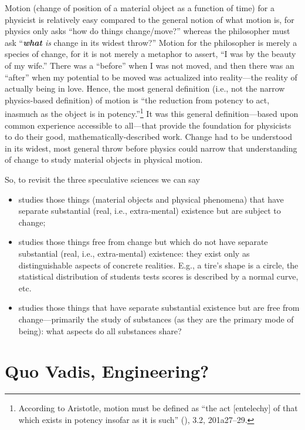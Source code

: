 Motion (change of position of a material object as a function of time) for a physicist is relatively easy compared to the general notion of what motion is, for physics only asks ``how do things change/move?'' whereas the philosopher must ask ``\textit{\textbf{what} is} change in its widest throw?'' Motion for the philosopher is merely a species of change, for it is not merely a metaphor to assert, ``I was  by the beauty of my wife.'' There was a ``before'' when I was not moved, and then there was an ``after'' when my potential to be moved was actualized into reality---the reality of actually being in love. Hence, the most general definition (i.e., not the narrow physics-based definition) of motion is ``the reduction from potency to act, inasmuch as the object is in potency.''\footnote{According to Aristotle, motion must be defined as ``the act [entelechy] of that which exists in potency insofar as it is such'' (),  3.2, 201a27--29.} It was this general definition---based upon common experience accessible to all---that provide the foundation for physicists to do their good, mathematically-described work. Change had to be understood in its widest, most general throw before physics could narrow that understanding of change to study material objects in physical motion.

So, to revisit the three speculative sciences we can say

\begin{itemize}
\item {} studies those things (material objects and physical phenomena) that have separate substantial (real, i.e., extra-mental) existence but are subject to change;
\item {} studies those things free from change but which do not have separate substantial (real, i.e., extra-mental) existence: they exist only as distinguishable aspects of concrete realities. E.g., a tire's shape is a circle, the statistical distribution of students tests scores is described by a normal curve, etc.
\item {} studies those things that have separate substantial existence but are free from change---primarily the study of substances (as they are the primary mode of being): what aspects do all substances share?
\end{itemize}

\section{Quo Vadis, Engineering?}

